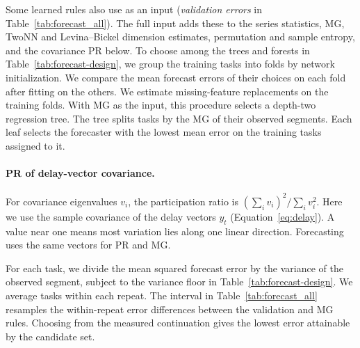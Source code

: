 {Some learned rules also use  as an input (\emph{validation errors} in Table~\ref{tab:forecast_all}). The full input adds these to the series statistics, MG, TwoNN and Levina--Bickel dimension estimates, permutation and sample entropy, and the covariance PR below. To choose among the trees and forests in Table~\ref{tab:forecast-design}, we group the training tasks into folds by network initialization. We compare the mean forecast errors of their choices on each fold after fitting on the others. We estimate missing-feature replacements on the training folds. With MG as the input, this procedure selects a depth-two regression tree. The tree splits tasks by the MG of their observed segments. Each leaf selects the forecaster with the lowest mean error on the training tasks assigned to it.

\paragraph{PR of delay-vector covariance.}
For covariance eigenvalues $v_i$, the participation ratio is $(\sum_i v_i)^2/\sum_i v_i^2$. Here we use the sample covariance of the delay vectors $y_t$ (Equation~\eqref{eq:delay}). A value near one means most variation lies along one linear direction. Forecasting uses the same vectors for PR and MG.

\begin{table}[ht]
\centering\small
\caption{Forecast NMSE by input or selection rule. Entries show mean $\pm$ standard deviation.}
\label{tab:forecast_all}

\end{table}

For each task, we divide the mean squared forecast error by the variance of the observed segment, subject to the variance floor in Table~\ref{tab:forecast-design}. We average tasks within each repeat. The interval in Table~\ref{tab:forecast_all} resamples the within-repeat error differences between the validation and MG rules. Choosing from the measured continuation gives the lowest error attainable by the candidate set.

}
